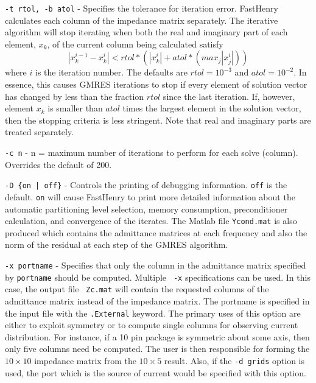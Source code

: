 \vspace{0.2in}
{\tt -t rtol, -b atol} - Specifies the tolerance for iteration error.
FastHenry calculates each column of the impedance matrix separately.  The
iterative algorithm will stop iterating when both the real and
imaginary part of each element, $x_k$, of the
current column being calculated satisfy
\begin{equation}
|x^{i - 1}_k - x^i_k| < rtol*(|x^i_k| + atol*(max_j|x_j^i|)  )
\end{equation}
where $ i $ is the iteration number.
The defaults are $ rtol = 10^{-3} $ and $ atol = 10^{-2} $.
In essence, this causes GMRES iterations to stop if every element of
solution vector has changed by less than the fraction $rtol$ since the last
iteration.  If, however, element $x_k$ is smaller than $atol$ times the
largest element in the solution vector, then the stopping criteria is
less stringent.  Note that real and imaginary parts are treated separately.


\vspace{0.2in}
{\tt -c n} - n = maximum number of iterations to perform for each
solve (column).  Overrides the default of 200.  

\vspace{0.2in}
{\tt -D \{on | off\}} - Controls the printing of debugging information.
{\tt off} is the default.  {\tt on} will cause FastHenry to print more
detailed information about the automatic partitioning level selection,
memory consumption, preconditioner calculation, and convergence of the
iterates.  The Matlab file {\tt Ycond.mat} is also produced which contains the
admittance matrices at each frequency and also the norm of the
residual at each step of the GMRES algorithm.

\vspace{0.2in}
{\tt -x portname} - Specifies that only the column in the admittance
matrix specified by {\tt portname} should be computed.  Multiple {\tt
-x} specifications can be used.  In this case, the output file {\tt
Zc.mat} will contain the requested columns of the admittance matrix
instead of the impedance matrix.  The portname is specified in the
input file with the {\tt .External} keyword.  The primary uses of this
option are either to exploit symmetry or to compute single columns for
observing current distribution.  For instance, if a 10 pin package is
symmetric about some axis, then only five columns need be computed.
The user is then responsible for forming the $10\times 10$ impedance
matrix from the $10 \times 5$ result.  Also, if the {\tt -d grids}
option is used, the port which is the source of current would be
specified with this option.


